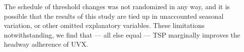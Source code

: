 \documentclass[3p, authoryear, review]{elsarticle} %
\begin{document}
The schedule of threshold changes was not randomized in any way,
and it is possible that the results of this study are tied up in unaccounted
seasonal variation, or other omitted explanatory variables. These limitations
notwithstanding, we find that --- all else equal --- TSP marginally improves the
headway adherence of UVX.


\end{document}
